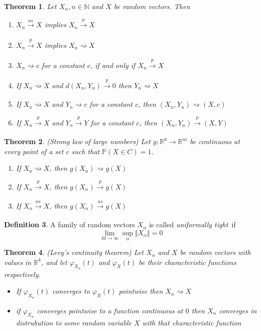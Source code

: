 \documentclass[12pt]{article}
\newtheorem{theorem}{Theorem}[section]
\theoremstyle{definition}
\newtheorem{definition}[theorem]{Definition}
\theoremstyle{remark}
\numberwithin{equation}{section}
\newcommand{\RR}{\mathbb{R}}
\newcommand{\al}{\alpha}
\newcommand{\PP}{\mathbb{P}}
\newcommand{\NN}{\mathbb{N}}
\begin{document}
\begin{theorem}
	Let $X_n, n\in\NN$ and $X$ be random vectors. Then
	\begin{enumerate}
		\item $X_n\xrightarrow[]{as} X$ implies $X_n \xrightarrow[]{p} X$
		\item $X_n\xrightarrow[]{p} X$ implies $X_n\rightsquigarrow X$
		\item $X_n\rightsquigarrow c$ for a constant $c$, if and only if $X_n\xrightarrow[]{p} X$
		\item If $X_n\rightsquigarrow X$ and $d(X_n, Y_n)\xrightarrow[]{p} 0$ then $Y_n\rightsquigarrow X$
		\item If $X_n\rightsquigarrow X$ and $Y_n\rightsquigarrow c$ for a constant $c$, then $(X_n, Y_n) \rightsquigarrow (X, c)$
		\item If $X_n\xrightarrow[]{p} X$ and $Y_n\xrightarrow[]{p} Y$ for a constant $c$, then $(X_n, Y_n) \xrightarrow[]{p} (X, Y)$
	\end{enumerate}
\end{theorem}

\begin{theorem}\label{cont_map_thm}\emph{(Strong law of large numbers)} Let $g:\RR^k\rightarrow\RR^m$ be continuous at every point of a set $c$ such that $\PP(X\in C) = 1$.
	\begin{enumerate}
		\item If $X_n\rightsquigarrow X$, then $g(X_n)\rightsquigarrow g(X)$
		\item If $X_n\xrightarrow[]{p} X$, then $g(X_n)\xrightarrow[]{p} g(X)$
		\item If $X_n\xrightarrow[]{as} X$, then $g(X_n)\xrightarrow[]{as} g(X)$
	\end{enumerate}
\end{theorem}

\begin{definition}
A family of random vectors $X_\al$ is called \emph{uniformally tight}~if
\begin{equation*}
	\lim_{M\rightarrow \infty} \sup_\alpha \Vert X_\alpha \Vert = 0
\end{equation*}
\end{definition}

\begin{theorem}\label{levys_thm}\emph{(Levy's continuity theorem)} Let $X_n$ and $X$ be random vectors with values in $\RR^k$, and let $\varphi_{X_n}(t)$ and $\varphi_{X}(t)$ be their characteristic functions respectively.
\begin{itemize}
\item If $\varphi_{X_n}(t)$ converges to $\varphi_{X}(t)$ pointwise then $X_n\rightsquigarrow X$
\item if $\varphi_{X_n}$ converges pointwise to a function continuous at $0$ then $X_n$ converges in distrubution to some random variable $X$ with that characteristic function
\end{itemize}
\end{theorem}
\end{document}
